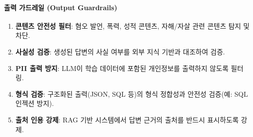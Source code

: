 \paragraph{출력 가드레일 (Output Guardrails)}

\begin{enumerate}
 \item \textbf{콘텐츠 안전성 필터}: 혐오 발언, 폭력, 성적 콘텐츠, 자해/자살 관련 콘텐츠 탐지 및 차단.
 \item \textbf{사실성 검증}: 생성된 답변의 사실 여부를 외부 지식 기반과 대조하여 검증.
 \item \textbf{PII 출력 방지}: LLM이 학습 데이터에 포함된 개인정보를 출력하지 않도록 필터링.
 \item \textbf{형식 검증}: 구조화된 출력(JSON, SQL 등)의 형식 정합성과 안전성 검증(예: SQL 인젝션 방지).
 \item \textbf{출처 인용 강제}: RAG 기반 시스템에서 답변 근거의 출처를 반드시 표시하도록 강제.
\end{enumerate}

